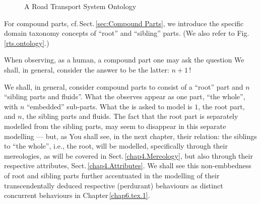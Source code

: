 \noindent
\mnewfoil
{}

{
 \begin{figure}[h]
  \begin{center}
    \caption{A Road Transport System Ontology \dbsquare}\label{rts.ontology}
  \end{center}
\end{figure}
}

\label{Root and Sibling Parts}

\begynd
\pind For compound parts, cf.\,Sect.\,\vref{sec:Compound Parts}, %
\begynd
\pind we introduce the specific domain taxonomy concepts of ``root'' and ``sibling'' parts.
\pind (We also refer to Fig.\,\vref{rts.ontology}.)
\afslut

\pind When observing, as a human, a compound part\ysf{,} \nyl one may ask the question
\begynd
\pind {}
\pind We shall, in general, consider the answer to be the latter: $n+1$\,!
\afslut
\afslut

\mnewfoil

\begynd
\pind We shall, in general, consider compound parts to consist of
\begynd
\pind a ``root'' part\ysf{}
\pind and $n$ ``sibling parts and fluids''.
\afslut
\pind What the  observes
\begynd
\pind appear\ysf{} as one part, ``the whole'',
\pind with $n$ ``embedded'' sub-parts.
\afslut
\pind What the  is asked to model is
\begynd
\pind $1$, the root part, and
\pind $n$, the sibling\ysf{} parts and fluids.
\afslut
\mnewfoil
\pind The fact that the root part is separately modelled from the sibling parts,
\pind may seem to disappear in this separate modelling ---
\pind but, as You shall see, in the next chapter,
\begynd
\pind their relation: the siblings to ``the whole'', i.e., the root,
\pind will be modelled, specifically through their mereologies,
\pind as will be covered in Sect.\,\ref{chap4.Mereology},
\pind but also through their respective attributes, Sect.\,\ref{chap4.Attributes}.
\afslut
\pind We shall see this non-embbedness of root and sibling parts
\begynd
\pind further accentuated in the modelling of their transcendentally deduced
\pind respective (perdurant) behaviours as distinct concurrent behaviours
\pind in Chapter\,\ref{chap6.tex.1}.
\afslut
\afslut

